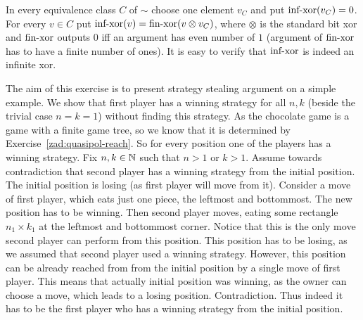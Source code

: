 {
In every equivalence class $C$ of $\sim$ choose one element $v_C$ and put $\textup{inf-xor}(v_C) = 0$.
For every $v \in C$ put $\textup{inf-xor}(v) = \textup{fin-xor}(v \otimes v_C)$, where $\otimes$ is the standard bit xor
and $\textup{fin-xor}$ outputs $0$ iff an argument has even number of $1$ (argument of $\textup{fin-xor}$ has to have
a finite number of ones). It is easy to verify that $\textup{inf-xor}$ is indeed an infinite xor.
}



{
The aim of this exercise is to present strategy stealing argument on a simple example.
We show that first player has a winning strategy for all $n, k$ (beside the trivial case $n = k = 1$)
without finding this strategy. As the chocolate game is a  game with a finite game tree, so  we know that it is determined by Exercise~\ref{zad:quasipol-reach}.
So for every position one of the players has a winning strategy. Fix $n, k \in \mathbb{N}$ such that $n > 1$ or $k > 1$.
Assume towards contradiction that second player has a winning strategy from the initial position.
The initial position is losing (as first player will move from it).
Consider a move of first player, which eats just one piece, the leftmost and bottommost.
The new position has to be winning. Then second player moves, eating some rectangle $n_1 \times k_1$
at the leftmost and bottommost corner. Notice that this is the only move second player can perform from this position.
This position has to be losing, as we assumed that second player used a winning strategy.
However, this position can be  already reached from from the initial position by a single move of first player.
This means that actually initial position was winning, as the owner can choose a move, which leads to a losing position.
Contradiction. Thus indeed it has to be the first player who has a winning strategy from the initial position.
}


